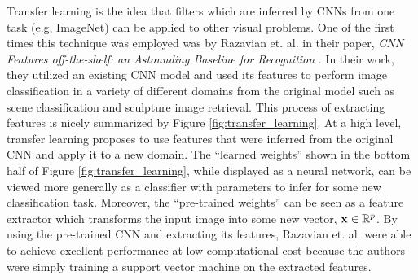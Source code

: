 \documentclass[../thesis.tex]{subfiles}
\begin{document}
Transfer learning is the idea that filters which are inferred by CNNs from one
task (e.g, ImageNet) can be applied to other visual problems. One of the first
times this technique was employed was by Razavian et. al. in their paper,
\textit{CNN Features off-the-shelf: an Astounding Baseline for Recognition}
\cite{sharif2014cnn}. In their work, they utilized an existing CNN model and
used its features to perform image classification in a variety of different
domains from the original model such as scene classification and sculpture image
retrieval. This process of extracting features is nicely summarized by Figure
\ref{fig:transfer_learning}. At a high level, transfer learning proposes to use
features that were inferred from the original CNN and apply it to a new domain.
The ``learned weights'' shown in the bottom half of Figure
\ref{fig:transfer_learning}, while displayed as a neural network, can be viewed
more generally as a classifier with parameters to infer for some new
classification task. Moreover, the ``pre-trained weights'' can be seen as a
feature extractor which transforms the input image into some new vector,
$\mathbf{x} \in \mathbb{R}^p$. By using the pre-trained CNN and extracting its features,
Razavian et. al. were able to achieve excellent performance at low computational
cost because the authors were simply training a support vector machine on the
extracted features.
\end{document}
